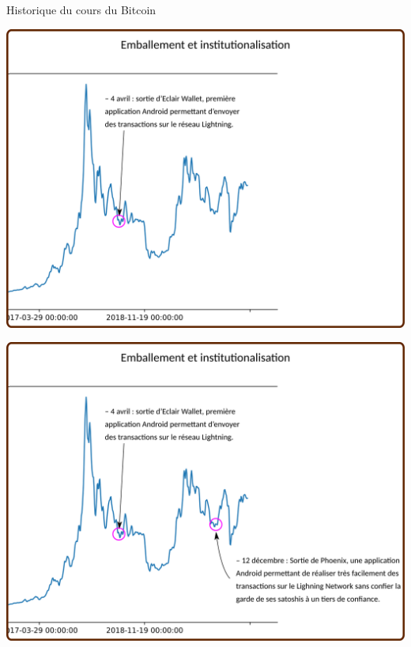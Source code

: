 \documentclass[presentation]{beamer}
\begin{document}
\begin{frame}[label={sec:org6ff9387}]{Historique du cours du Bitcoin}
\begin{block}{}
\begin{center}
\includegraphics[width=.95\textwidth]{./Pictures/Timeline/71emballement_lightning.png}
\end{center}
\end{block}

\begin{block}{}
\begin{center}
\includegraphics[width=.95\textwidth]{./Pictures/Timeline/72emballement_phoenix.png}
\end{center}
\end{block}


\end{frame}
\end{document}
